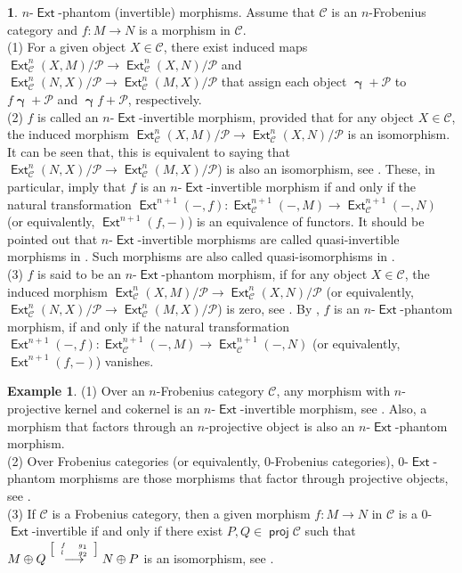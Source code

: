 \documentclass[11pt,a4paper]{amsart}
\newcommand{\rt}{\rightarrow}
\newcommand{\lrt}{\longrightarrow}
\newcommand{\st}{\stackrel}
\newcommand{\C}{\mathscr{C} }
\newcommand{\p}{\mathfrak{p} }
\def\proj{\operatorname{\mathsf{proj}}}
\def\Ext{\operatorname{{\mathsf{Ext}}}}
\def\p{\mathcal P}
\def\ga{\operatorname{\boldsymbol{\gamma}}}
\theoremstyle{definition}
\newtheorem{example}[theorem]{Example}
\newtheorem{s}[theorem]{}
\theoremstyle{plain}
\theoremstyle{definition}
\numberwithin{equation}{section}
\begin{document}
\begin{s}{\sc $n$-$\Ext$-phantom (invertible) morphisms.} Assume that $\C$ is an $n$-Frobenius category and $f:M\rt N$ is a morphism in $\C$.\\ (1) For a given object $X\in\C$, there exist induced maps $\Ext^n_{\C}(X, M)/{\p}\rt\Ext^n_{\C}(X, N)/{\p}$ and $\Ext^n_{\C}(N, X)/{\p}\rt\Ext^n_{\C}(M, X)/{\p}$ that assign  each object $\ga+\p$ to ${f\ga}+\p$ and ${\ga f}+\p$, respectively.\\ (2)
$f$ is called an $n$-$\Ext$-invertible morphism, provided that   for any object $X\in\C$, the induced morphism $\Ext^n_{\C}(X, M)/{\p}\rt\Ext^n_{\C}(X, N)/{\p}$ is an isomorphism. It can be seen that,  this is equivalent to saying that $\Ext^n_{\C}(N, X)/{\p}\rt\Ext^n_{\C}(M, X)/{\p}$) is also an isomorphism,  see \cite[Corollaries 3.4 and 4.8]{bfss}. These, in particular, imply that $f$ is an $n$-$\Ext$-invertible morphism if and only if the natural transformation $\Ext^{n+1}(-, f):\Ext^{n+1}_{\C}(-,M)\lrt\Ext^{n+1}_{\C}(-,N)$ (or equivalently, $\Ext^{n+1}(f, -)$) is an equivalence of functors. 
It should be pointed out that $n$-$\Ext$-invertible morphisms are called quasi-invertible morphisms in \cite{bfss}. Such morphisms are also called quasi-isomorphisms in \cite{hr}.\\
 (3) $f$ is said to be an $n$-$\Ext$-phantom morphism, if   for any object $X\in\C$, the induced morphism $\Ext^n_{\C}(X, M)/{\p}\rt\Ext^n_{\C}(X, N)/{\p}$  (or equivalently, $\Ext^n_{\C}(N, X)/{\p}\lrt\Ext^n_{\C}(M, X)/{\p}$) is zero, see \cite[Theorem 6.7 and Definition 6.8]{bfss}. By \cite[Corollary 6.9]{bfss},  $f$ is an $n$-$\Ext$-phantom morphism, if and only if  the natural transformation $\Ext^{n+1}(-, f):\Ext^{n+1}_{\C}(-,M)\lrt\Ext^{n+1}_{\C}(-,N)$ (or equivalently, $\Ext^{n+1}(f, -)$) vanishes.  
\end{s}

\begin{example}(1) Over an $n$-Frobenius category $\C$, any morphism
with $n$-projective kernel and cokernel is an  $n$-$\Ext$-invertible morphism, see \cite[Corollary 3.6]{bfss}. Also, a morphism that factors through an $n$-projective object is also an $n$-$\Ext$-phantom morphism.\\ (2)  Over Frobenius categories (or equivalently, 0-Frobenius categories), 0-$\Ext$-phantom morphisms are those morphisms that factor through projective objects, see \cite[Proposition 3.8(1)]{bfss1}.\\ (3) If $\C$ is a Frobenius category, then a given morphism $f: M\rt N$ in $\C$ is a 0-$\Ext$-invertible if  and only if there exist $P,Q\in\proj\C$ such that $M\oplus Q\st{{{\tiny {\left[\begin{array}{ll} f & g_1 \\ l & g_2 \end{array} \right]}}}}\lrt N\oplus P$ is an isomorphism, see \cite[Proposition 3.8(2)]{bfss1}.
\end{example}
\end{document}
